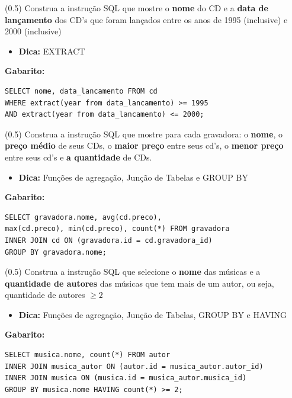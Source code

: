 \documentclass[12pt]{exam}
\begin{document}
\begin{questions}
\question (0.5) Construa a instrução SQL que mostre o \textbf{nome} do CD e a \textbf{data de lançamento} dos CD's que foram lançados entre os anos de 1995 (inclusive) e 2000 (inclusive)

\begin{itemize}
    \item \textbf{Dica:} EXTRACT
\end{itemize}

\textbf{Gabarito:}
\begin{verbatim}
SELECT nome, data_lancamento FROM cd 
WHERE extract(year from data_lancamento) >= 1995 
AND extract(year from data_lancamento) <= 2000;
\end{verbatim}



\question (0.5) Construa a instrução SQL que mostre para cada gravadora: o \textbf{nome}, o \textbf{preço médio} de seus CDs, o \textbf{maior preço} entre seus cd's, o \textbf{menor preço} entre seus cd's e \textbf{a quantidade} de CDs.

\begin{itemize}
    \item \textbf{Dica:} Funções de agregação, Junção de Tabelas e GROUP BY
\end{itemize}

\textbf{Gabarito:}
\begin{verbatim}
SELECT gravadora.nome, avg(cd.preco), 
max(cd.preco), min(cd.preco), count(*) FROM gravadora 
INNER JOIN cd ON (gravadora.id = cd.gravadora_id)
GROUP BY gravadora.nome;
\end{verbatim}

\question (0.5) Construa a instrução SQL que selecione o \textbf{nome} das músicas e a \textbf{quantidade de autores} das músicas que tem mais de um autor, ou seja, quantidade de autores $\geq 2$

\begin{itemize}
    \item \textbf{Dica:} Funções de agregação, Junção de Tabelas, GROUP BY e HAVING
\end{itemize}

\textbf{Gabarito:}
\begin{verbatim}
SELECT musica.nome, count(*) FROM autor 
INNER JOIN musica_autor ON (autor.id = musica_autor.autor_id) 
INNER JOIN musica ON (musica.id = musica_autor.musica_id) 
GROUP BY musica.nome HAVING count(*) >= 2;
\end{verbatim}


\end{questions}
\end{document}
